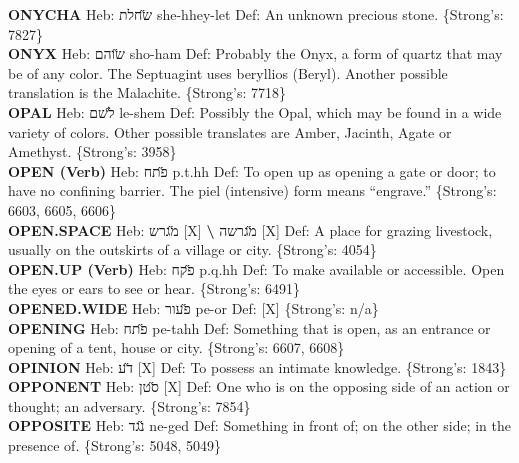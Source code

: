 {\textbf{ONYCHA} Heb: {\large\H שחלת} she-hhey-let Def: An unknown precious stone. \{Strong's: 7827\}\hfill{}\\

\textbf{ONYX} Heb: {\large\H שוהם} sho-ham Def: Probably the Onyx, a form of quartz that may be of any color. The Septuagint uses beryllios (Beryl). Another possible translation is the Malachite. \{Strong's: 7718\}\hfill{}\\

\textbf{OPAL} Heb: {\large\H לשם} le-shem Def: Possibly the Opal, which may be found in a wide variety of colors. Other possible translates are Amber, Jacinth, Agate or Amethyst. \{Strong's: 3958\}\hfill{}\\

\textbf{OPEN (Verb)} Heb: {\large\H פתח} p.t.hh Def: To open up as opening a gate or door; to have no confining barrier. The piel (intensive) form means ``engrave.'' \{Strong's: 6603, 6605, 6606\}\hfill{}\\

\textbf{OPEN.SPACE} Heb: {\large\H מגרש} {[}X{]} \textbf{\textbackslash{}} {\large\H מגרשה} {[}X{]} Def: A place for grazing livestock, usually on the outskirts of a village or city. \{Strong's: 4054\}\hfill{}\\

\textbf{OPEN.UP (Verb)} Heb: {\large\H פקח} p.q.hh Def: To make available or accessible. Open the eyes or ears to see or hear. \{Strong's: 6491\}\hfill{}\\

\textbf{OPENED.WIDE} Heb: {\large\H פעור} pe-or Def: {[}X{]} \{Strong's: n/a\}\hfill{}\\

\textbf{OPENING} Heb: {\large\H פתח} pe-tahh Def: Something that is open, as an entrance or opening of a tent, house or city. \{Strong's: 6607, 6608\}\hfill{}\\

\textbf{OPINION} Heb: {\large\H דע} {[}X{]} Def: To possess an intimate knowledge. \{Strong's: 1843\}\hfill{}\\

\textbf{OPPONENT} Heb: {\large\H סטן} {[}X{]} Def: One who is on the opposing side of an action or thought; an adversary. \{Strong's: 7854\}\hfill{}\\

\textbf{OPPOSITE} Heb: {\large\H נגד} ne-ged Def: Something in front of; on the other side; in the presence of. \{Strong's: 5048, 5049\}\hfill{}\\

}
